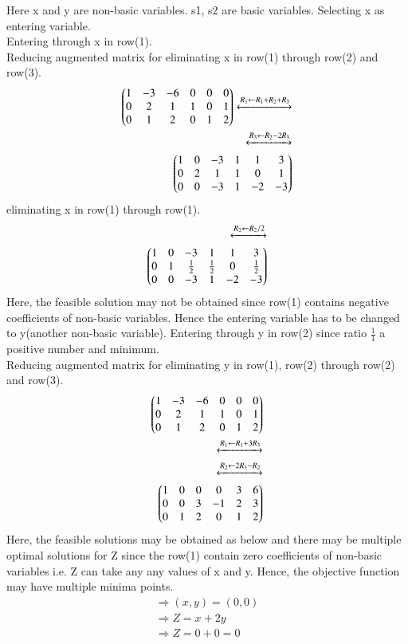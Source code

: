 \documentclass[journal,12pt,twocolumn]{IEEEtran}
\begin{document}
Here x and y are non-basic variables. s1, s2 are basic variables. Selecting x as entering variable.\\
Entering through x in row(1).\\
Reducing augmented matrix for eliminating x in row(1) through row(2) and row(3).
\begin{align}
\begin{pmatrix}1 & -3 & -6 & 0 & 0 & 0\\0 & 2 & 1 & 1 & 0 & 1\\0 & 1 & 2 & 0 & 1 & 2\end{pmatrix}
\xleftrightarrow[]{R_1 \leftarrow {R_1+R_2+R_3}}\\
\xleftrightarrow[]{R_3 \leftarrow {R_2-2R_3}}\\
\begin{pmatrix}1 & 0 & -3 & 1 & 1 & 3\\0 & 2 & 1 & 1 & 0 & 1\\0 & 0 & -3 & 1 & -2 & -3\end{pmatrix}
\end{align}
eliminating x in row(1) through row(1).
\begin{align}
\xleftrightarrow[]{R_2 \leftarrow {R_2/2}}\\
\begin{pmatrix}1 & 0 & -3 & 1 & 1 & 3\\0 & 1 & \frac{1}{2} & \frac{1}{2} & 0 & \frac{1}{2}\\0 & 0 & -3 & 1 & -2 & -3\end{pmatrix}
\end{align}
Here, the feasible solution may not be obtained since row(1) contains negative coefficients of non-basic variables. Hence the entering variable has to be changed to y(another non-basic variable).
Entering through y in row(2) since ratio $\frac{1}{1}$ a positive number and minimum.\\
Reducing augmented matrix for eliminating y in row(1), row(2) through row(2) and row(3).
\begin{align}
\begin{pmatrix}1 & -3 & -6 & 0 & 0 & 0\\0 & 2 & 1 & 1 & 0 & 1\\0 & 1 & 2 & 0 & 1 & 2\end{pmatrix}\\
\xleftrightarrow[]{R_1 \leftarrow {R_1+3R_3}}\\
\xleftrightarrow[]{R_2 \leftarrow {2R_3-R_2}}\\
\begin{pmatrix}1 & 0 & 0 & 0 & 3 & 6\\0 & 0 & 3 & -1 & 2 & 3\\0 & 1 & 2 & 0 & 1 & 2\end{pmatrix}
\end{align}
Here, the feasible solutions may be obtained as below and there may be multiple optimal solutions for Z since the row(1) contain zero coefficients of non-basic variables i.e. Z can take any any values of x and y. Hence, the objective function may have multiple minima points.
\begin{align}
\Rightarrow (x,y)=(0,0)\\
\Rightarrow Z=x+2y\\
\Rightarrow Z=0+0=0
\end{align}
\end{document}

